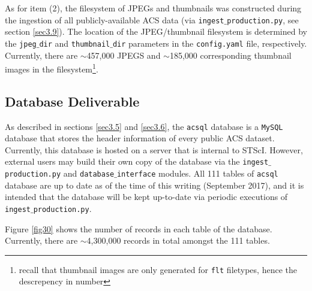 \documentclass[10pt,journal,compsoc]{IEEEtran}
\begin{document}
As for item (2), the filesystem of JPEGs and thumbnails was constructed during the ingestion of all publicly-available ACS data (via \texttt{ingest$\_$production.py}, see section \ref{sec3.9}).
The location of the JPEG/thumbnail filesystem is determined by the \texttt{jpeg$\_$dir} and \texttt{thumbnail$\_$dir} parameters in the \texttt{config.yaml} file, respectively.
Currently, there are $\sim$457,000 JPEGS and $\sim$185,000 corresponding thumbnail images in the filesystem\footnote{recall that thumbnail images are only generated for \texttt{flt} filetypes,
hence the descrepency in number}.


\subsection{Database Deliverable} \label{sec4.2}

As described in sections \ref{sec3.5} and \ref{sec3.6}, the \texttt{acsql} database is a \texttt{MySQL} database that stores the header information of every public ACS dataset.  Currently,
this database is hosted on a server that is internal to STScI.  However, external users may build their own copy of the database via the \texttt{ingest$\_$production.py} and
\texttt{database$\_$interface} modules.  All 111 tables of \texttt{acsql} database are up to date as of the time of this writing (September 2017), and it is intended that the database will
be kept up-to-date via periodic executions of \texttt{ingest$\_$production.py}.

Figure \ref{fig30} shows the number of records in each table of the database.  Currently, there are $\sim$4,300,000 records in total amongst the 111 tables.
\end{document}
